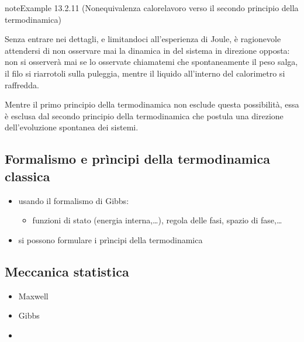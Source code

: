 \documentclass[letterpaper,10pt,italian]{jupyterBook}
\begin{document}
\begin{sphinxadmonition}{note}{Example 13.2.11 (Non\sphinxhyphen{}equivalenza calore\sphinxhyphen{}lavoro \sphinxhyphen{} verso il secondo principio della termodinamica)}



\sphinxAtStartPar
Senza entrare nei dettagli, e limitandoci all’esperienza di Joule, è ragionevole attendersi di non osservare mai la dinamica in del sistema in direzione opposta: non si osserverà mai \sphinxhyphen{} se lo osservate chiamatemi \sphinxhyphen{} che spontaneamente il peso salga, il filo si ri\sphinxhyphen{}arrotoli sulla puleggia, mentre il liquido all’interno del calorimetro si raffredda.

\sphinxAtStartPar
Mentre il primo principio della termodinamica non esclude questa possibilità, essa è esclusa dal secondo principio della termodinamica che postula una direzione dell’evoluzione spontanea dei sistemi.
\end{sphinxadmonition}


\subsection{Formalismo e prìncipi della termodinamica classica}
\label{\detokenize{ch/thermodynamics/foundation-experiments:formalismo-e-principi-della-termodinamica-classica}}\label{\detokenize{ch/thermodynamics/foundation-experiments:physics-hs-thermodynamics-foundation-experiments-gibbs}}
\sphinxAtStartPar
{}
\begin{itemize}
\item {} 
\sphinxAtStartPar
usando il formalismo di Gibbs:
\begin{itemize}
\item {} 
\sphinxAtStartPar
funzioni di stato (energia interna,…), regola delle fasi, spazio di fase,…

\end{itemize}

\item {} 
\sphinxAtStartPar
si possono formulare i prìncipi della termodinamica

\end{itemize}


\subsection{Meccanica statistica}
\label{\detokenize{ch/thermodynamics/foundation-experiments:meccanica-statistica}}\label{\detokenize{ch/thermodynamics/foundation-experiments:physics-hs-thermodynamics-foundation-experiments-stat-mech}}\begin{itemize}
\item {} 
\sphinxAtStartPar
Maxwell

\item {} 
\sphinxAtStartPar
Gibbs

\item {} 
\sphinxAtStartPar
{}

\end{itemize}
\end{document}
